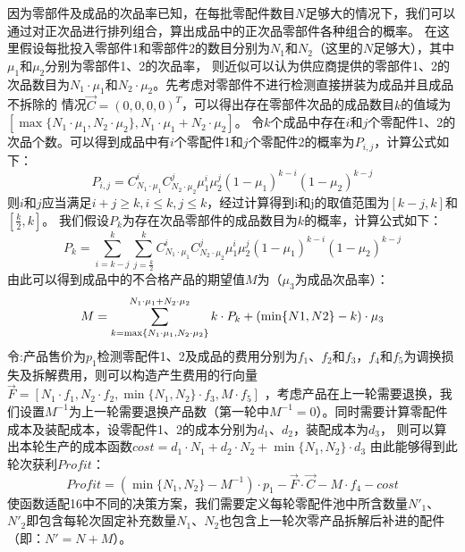 \documentclass[withoutpreface,bwprint]{cumcmthesis} %
\begin{document}
因为零部件及成品的次品率已知，在每批零配件数目$N$足够大的情况下，我们可以通过对正次品进行排列组合，算出成品中的正次品零部件各种组合的概率。
在这里假设每批投入零部件1和零部件2的数目分别为$N_{1}$和$N_{2}$（这里的$N$足够大），其中$\mu_{1}$和$\mu_{2}$分别为零部件1、2的次品率，
则近似可以认为供应商提供的零部件1、2的次品数目为$N_{1}\cdot\mu_{1}$和$N_{2}\cdot\mu_{2}$。先考虑对零部件不进行检测直接拼装为成品并且成品不拆除的
情况$\vec{C}=(0,0,0,0)^{T}$，可以得出存在零部件次品的成品数目$k$的值域为$[\max \{N_{1}\cdot\mu_{1},N_{2}\cdot\mu_{2} \},N_{1}\cdot\mu_{1}+N_{2}\cdot\mu_{2}]$。
令$k$个成品中存在$i$和$j$个零配件1、2的次品个数。可以得到成品中有$i$个零配件1和$j$个零配件2的概率为$P_{i,j}$，计算公式如下：
\begin{equation}
	P_{i,j}=C_{N_{1}\cdot\mu_{1}}^{i}C_{N_{2}\cdot\mu_{2}}^{j}\mu_{1}^{i}\mu_{2}^{j}(1-\mu_{1})^{k-i}(1-\mu_{2})^{k-j}
	\label{eq:1}
\end{equation}
则$i$和$j$应当满足$i+j\ge k,i\le k,j\le k$，经过计算得到i和j的取值范围为$[k-j,k]$和$[\frac{k}{2},k]$。
我们假设$P_{k}$为存在次品零部件的成品数目为$k$的概率，计算公式如下：
\begin{equation}
	P_{k}=\sum_{i=k-j}^{k}\sum_{j=\frac{k}{2}}^{k}C_{N_{1}\cdot\mu_{1}}^{i}C_{N_{2}\cdot\mu_{2}}^{j}\mu_{1}^{i}\mu_{2}^{j}(1-\mu_{1})^{k-i}(1-\mu_{2})^{k-j}
	\label{eq:2}
\end{equation}
由此可以得到成品中的不合格产品的期望值$M$为（$\mu_{3}$为成品次品率）：
\begin{equation}
	M=\sum_{k=\max \{N_{1}\cdot\mu_{1},N_{2}\cdot\mu_{2} \}}^{N_{1}\cdot\mu_{1}+N_{2}\cdot\mu_{2}}k\cdot P_{k} + (\min \{ N1,N2\}-k)\cdot \mu_{3}\\
	\label{eq:3}
\end{equation}
令:产品售价为$p_{1}$检测零配件1、2及成品的费用分别为$f_{1}$、$f_{2}$和$f_{3}$，$f_{4}$和$f_{5}$为调换损失及拆解费用，则可以构造产生费用的行向量$\vec{F}=[N_{1}\cdot f_{1},N_{2}\cdot f_{2},\min \{N_{1},N_{2}\}\cdot f_{3},M\cdot f_{5}]$
，考虑产品在上一轮需要退换，我们设置$M^{-1}$为上一轮需要退换产品数（第一轮中$M^{-1}=0$）。同时需要计算零配件成本及装配成本，设零配件1、2的成本分别为$d_{1}$、$d_{2}$，装配成本为$d_{3}$，
则可以算出本轮生产的成本函数$cost=d_{1}\cdot N_{1}+d_{2}\cdot N_{2}+\min \{ N_{1},N_{2}\}\cdot d_{3}$
由此能够得到此轮次获利$Profit$：
\begin{equation}
	\textit{Profit}=(\min \{N_{1},N_{2}\}-M^{-1})\cdot p_{1}-\vec{F}\cdot \vec{C}-M\cdot f_{4}-cost
	\label{eq:4}
\end{equation}
使函数适配16中不同的决策方案，我们需要定义每轮零配件池中所含数量$N'_{1}$、$N'_{2}$即包含每轮次固定补充数量$N_{1}$、$N_{2}$也包含上一轮次零产品拆解后补进的配件（即：$N'=N+M$）。
\end{document}
